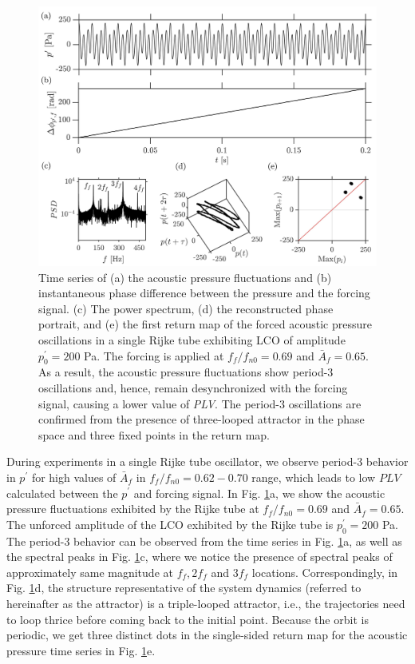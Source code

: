 \documentclass[%
 aps,
 amsmath,amssymb,
preprint,%
superscriptaddress,
]{revtex4-2}
\begin{document}
\begin{figure}[h!]
\centering
\includegraphics[scale=0.13]{fig8_single_osc_110Hz_28mV_200Pa_LCO.jpg}
\caption{\label{superharmonic} Time series of (a) the acoustic pressure fluctuations and (b) instantaneous phase difference between the pressure and the forcing signal. (c) The power spectrum, (d) the reconstructed phase portrait, and (e) the first return map of the forced acoustic pressure oscillations in a single Rijke tube exhibiting LCO of amplitude $p^\prime_{0} = 200$ Pa. The forcing is applied at $f_f/f_{n0} = 0.69$ and $\bar{A}_f= 0.65$. As a result, the acoustic pressure fluctuations show period-3 oscillations and, hence, remain desynchronized with the forcing signal, causing a lower value of \textit{PLV}. The period-3 oscillations are confirmed from the presence of three-looped attractor in the phase space and three fixed points in the return map.} 
\end{figure}

During experiments in a single Rijke tube oscillator, we observe period-3 behavior in $p^\prime$ for high values of $\bar{A}_f$ in $f_f/f_{n0} = 0.62-0.70$ range, which leads to low $PLV$ calculated between the $p^\prime$ and forcing signal. In Fig. \ref{superharmonic}a, we show the acoustic pressure fluctuations exhibited by the Rijke tube at $f_f/f_{n0} = 0.69$ and $\bar{A}_f = 0.65$. The unforced amplitude of the LCO exhibited by the Rijke tube is $p^\prime_{0} = 200$ Pa. The period-3 behavior can be observed from the time series in Fig. \ref{superharmonic}a, as well as the spectral peaks in Fig. \ref{superharmonic}c, where we notice the presence of spectral peaks of approximately same magnitude at $f_f, 2f_f$ and $3f_f$ locations. Correspondingly, in Fig. \ref{superharmonic}d, the structure representative of the system dynamics (referred to hereinafter as the attractor) is a triple-looped attractor, i.e., the trajectories need to loop thrice before coming back to the initial point. Because the orbit is periodic, we get three distinct dots in the single-sided return map for the acoustic pressure time series in Fig. \ref{superharmonic}e.
\end{document}
